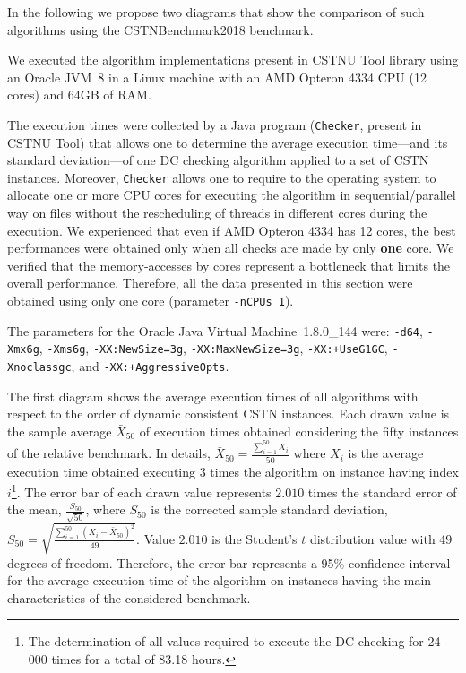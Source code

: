 \documentclass[a4paper,11pt]{article}
\begin{document}
In the following we propose two diagrams that show the comparison of such algorithms using the CSTNBenchmark2018 benchmark.

We executed the algorithm implementations present in CSTNU Tool library using an Oracle JVM~8 in a Linux machine with an AMD Opteron 4334 CPU (12 cores) and 64GB of RAM.

The execution times were collected by a Java program (\texttt{Checker}, present in CSTNU Tool) that allows one to determine the average execution time---and its standard deviation---of one DC checking algorithm applied to a set of CSTN instances. Moreover,  \texttt{Checker} allows one to require to the operating system to allocate one or more
CPU cores for executing the algorithm in sequential/parallel way on files without the rescheduling of threads in different cores during the execution.
We experienced that even if AMD Opteron 4334 has 12 cores, the best performances were obtained only when all checks are made by only \textbf{one} core.
We verified that the memory-accesses by cores represent a bottleneck that limits the overall performance.
Therefore, all the data presented in this section were obtained using only one core (parameter \texttt{-nCPUs 1}).

The parameters for the Oracle Java Virtual Machine~1.8.0\_144 were: \texttt{-d64}, \texttt{-Xmx6g}, \texttt{-Xms6g}, \texttt{-XX:NewSize=3g}, \texttt{-XX:MaxNewSize=3g}, \texttt{-XX:+UseG1GC}, \texttt{-Xnoclassgc}, and \texttt{-XX:+AggressiveOpts}. 

The first diagram shows the average execution times of all algorithms with respect to the order of dynamic consistent CSTN instances.
Each drawn value is the sample average $\bar{X}_{50}$ of execution times obtained considering the fifty instances of the relative benchmark. 
In details, $\bar{X}_{50}=\frac{\sum_{i=1}^{50} X_i}{50}$ where $X_i$ is the average execution time obtained executing 3 times the algorithm on instance having index $i$\footnote{The determination of all values required to execute the DC checking for 24 000 times for a total of 83.18 hours.}.
The error bar of each drawn value represents $2.010$ times the standard error of the mean, $\frac{S_{50}}{\sqrt{50}}$, where $S_{50}$ is the corrected sample standard deviation, $S_{50}= \sqrt{\frac{\sum_{i=1}^{50} (X_i-\bar{X}_{50})^2}{49}}$. Value $2.010$ is the Student's $t$ distribution value with 49 degrees of freedom. 
Therefore, the error bar represents a 95\% confidence interval for the average execution time of the algorithm on instances having the main characteristics of the considered benchmark.
\end{document}
